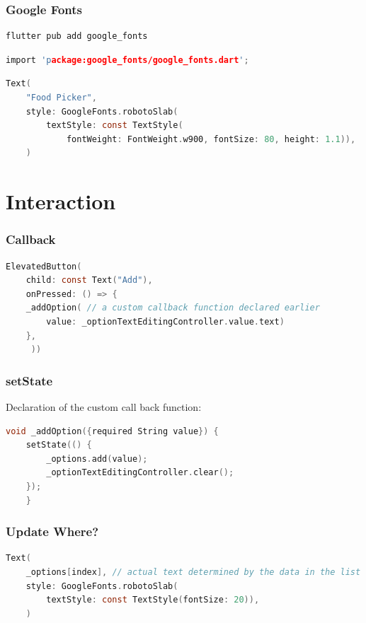 \documentclass[compress, aspectratio=32]{beamer}
\begin{document}
\begin{frame}[fragile]
    \frametitle{Google Fonts}
    \begin{lstlisting}[numbers=none]
flutter pub add google_fonts
    \end{lstlisting}
    \begin{lstlisting}[language=c, firstnumber=3]
import 'package:google_fonts/google_fonts.dart';
    \end{lstlisting}
    \begin{lstlisting}[language=c, firstnumber=100]
Text(
    "Food Picker",
    style: GoogleFonts.robotoSlab(
        textStyle: const TextStyle(
            fontWeight: FontWeight.w900, fontSize: 80, height: 1.1)),
    )
    \end{lstlisting}
\end{frame}

\section{Interaction}
\begin{frame}[fragile]
    \frametitle{Callback}
    \begin{lstlisting}[language=c, firstnumber=114]
ElevatedButton(
    child: const Text("Add"),
    onPressed: () => {
    _addOption( // a custom callback function declared earlier
        value: _optionTextEditingController.value.text)
    },
     ))
    \end{lstlisting}
\end{frame}
\begin{frame}[fragile]
    \frametitle{setState}
    Declaration of the custom call back function:
    \begin{lstlisting}[language=c, firstnumber=114]
void _addOption({required String value}) {
    setState(() {
        _options.add(value);
        _optionTextEditingController.clear();
    });
    }
    \end{lstlisting}        
\end{frame}

\begin{frame}[fragile]
    \frametitle{Update Where?}
    \begin{lstlisting}[language=c, firstnumber=151]
Text(
    _options[index], // actual text determined by the data in the list _options
    style: GoogleFonts.robotoSlab(
        textStyle: const TextStyle(fontSize: 20)),
    )
    \end{lstlisting}
\end{frame}
\end{document}
